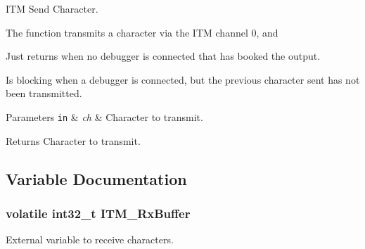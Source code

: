 I\+TM Send Character. 

The function transmits a character via the I\+TM channel 0, and \begin{DoxyItemize}
\item Just returns when no debugger is connected that has booked the output. \item Is blocking when a debugger is connected, but the previous character sent has not been transmitted.\end{DoxyItemize}

\begin{DoxyParams}[1]{Parameters}
\mbox{\tt in}  & {\em ch} & Character to transmit.\\
\hline
\end{DoxyParams}
\begin{DoxyReturn}{Returns}
Character to transmit. 
\end{DoxyReturn}


\subsection{Variable Documentation}
\subsubsection[{\texorpdfstring{I\+T\+M\+\_\+\+Rx\+Buffer}{ITM_RxBuffer}}]{\setlength{\rightskip}{0pt plus 5cm}volatile int32\+\_\+t I\+T\+M\+\_\+\+Rx\+Buffer}\hypertarget{group___c_m_s_i_s__core___debug_functions_ga12e68e55a7badc271b948d6c7230b2a8}{}\label{group___c_m_s_i_s__core___debug_functions_ga12e68e55a7badc271b948d6c7230b2a8}
External variable to receive characters. 